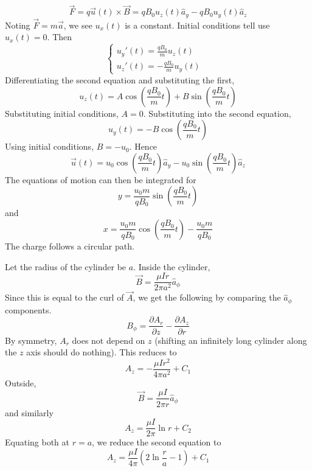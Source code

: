 \documentclass[answers]{exam}
\begin{document}
\begin{questions}
\begin{solution}
    $$\vec F = q\vec u(t) \times \vec B = qB_0u_z(t) \hat a_y - qB_0u_y(t) \hat a_z$$
    Noting $\vec F = m\vec a$, we see $u_x(t)$ is a constant. Initial conditions tell use $u_x(t) = 0$. Then
    $$\begin{cases} u_y'(t) = \frac{qB_0}{m}u_z(t) & \\ u_z'(t) = -\frac{qB_0}{m}u_y(t) & \end{cases}$$
    Differentiating the second equation and substituting the first,
    $$u_z(t) = A\cos\left(\frac{qB_0}{m}t\right) + B\sin\left(\frac{qB_0}{m}t\right)$$
    Substituting initial conditions, $A=0$. Substituting into the second equation,
    $$u_y(t) = -B\cos\left(\frac{qB_0}{m}t\right)$$
    Using initial conditions, $B = -u_0$. Hence
    $$\vec u(t) = u_0\cos\left(\frac{qB_0}{m}t\right)\hat a_y - u_0\sin\left(\frac{qB_0}{m}t\right)\hat a_z$$
    The equations of motion can then be integrated for
    $$y = \frac{u_0m}{qB_0}\sin\left(\frac{qB_0}{m}t\right)$$
    and
    $$x = \frac{u_0m}{qB_0}\cos\left(\frac{qB_0}{m}t\right) - \frac{u_0m}{qB_0}$$
    The charge follows a circular path.
\end{solution}


\begin{solution}
    Let the radius of the cylinder be $a$. Inside the cylinder,
    $$\vec B = \frac{\mu Ir}{2\pi a^2}\hat a_\phi$$
    Since this is equal to the curl of $\vec A$, we get the following by comparing the $\hat a_\phi$ components.
    $$B_\phi = \frac{\partial A_r}{\partial z} - \frac{\partial A_z}{\partial r}$$
    By symmetry, $A_r$ does not depend on $z$ (shifting an infinitely long cylinder along the $z$ axis should do nothing). This reduces to
    $$A_z = -\frac{\mu Ir^2}{4\pi a^2} + C_1$$
    Outside,
    $$\vec B = \frac{\mu I}{2\pi r} \hat a_\phi$$
    and similarly
    $$A_z = \frac{\mu I}{2\pi} \ln r + C_2$$
    Equating both at $r=a$, we reduce the second equation to
    $$A_z = \frac{\mu I}{4\pi} \left(2\ln\frac{r}{a} - 1\right) + C_1$$
\end{solution}



\end{questions}
\end{document}
